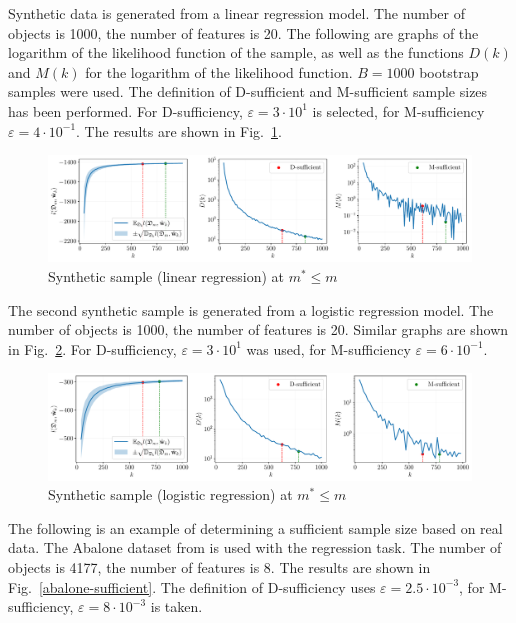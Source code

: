 \documentclass[
11pt,%
tightenlines,%
twoside,%
onecolumn,%
nofloats,%
nobibnotes,%
nofootinbib,%
superscriptaddress,%
noshowpacs,%
centertags]%
{revtex4-2}
\begin{document}
Synthetic data is generated from a linear regression model. The number of objects is 1000, the number of features is 20. The following are graphs of the logarithm of the likelihood function of the sample, as well as the functions $D(k)$ and $M(k)$ for the logarithm of the likelihood function. $B=1000$ bootstrap samples were used. The definition of D-sufficient and M-sufficient sample sizes has been performed. For D-sufficiency, $\varepsilon = 3 \cdot 10^{1}$ is selected, for M-sufficiency $\varepsilon = 4 \cdot 10^{-1}$. The results are shown in Fig.~\ref{synthetic-regression-sufficient}. 

\begin{figure}[h!]
    \centering
    \includegraphics[width=\textwidth]{paper/figures/synthetic-regression-sufficient.pdf}
    \caption{Synthetic sample (linear regression) at $m^*\leqslant m$}
    \label{synthetic-regression-sufficient}
\end{figure}

The second synthetic sample is generated from a logistic regression model. The number of objects is 1000, the number of features is 20. Similar graphs are shown in Fig.~\ref{synthetic-classification-sufficient}. For D-sufficiency, $\varepsilon = 3 \cdot 10^1$ was used, for M-sufficiency $\varepsilon = 6 \cdot 10^{-1}$.

\begin{figure}[h!]
    \centering
    \includegraphics[width=\textwidth]{paper/figures/synthetic-classification-sufficient.pdf}
    \caption{Synthetic sample (logistic regression) at $m^* \leqslant m$}
    \label{synthetic-classification-sufficient}
\end{figure}

The following is an example of determining a sufficient sample size based on real data. The Abalone dataset from \citep{UCI} is used with the regression task. The number of objects is 4177, the number of features is 8. The results are shown in Fig.~\ref{abalone-sufficient}. The definition of D-sufficiency uses $\varepsilon=2.5 \cdot 10^{-3}$, for M-sufficiency, $\varepsilon=8 \cdot 10^{-3}$ is taken.
\end{document}
